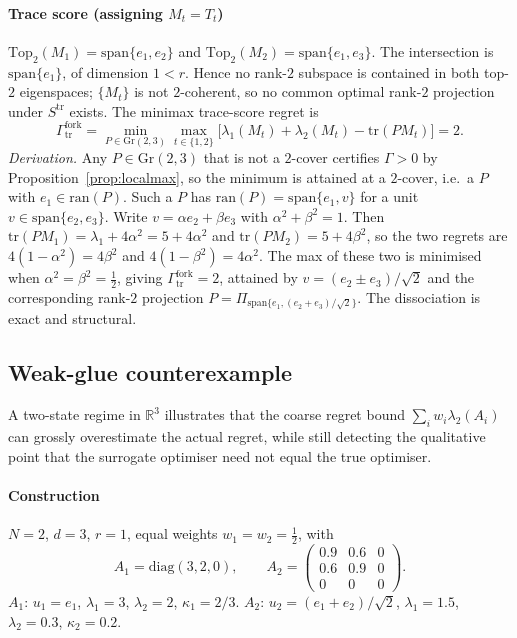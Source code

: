 \documentclass[final,3p,times]{elsarticle}
\newcommand{\Gr}{\mathrm{Gr}}
\newcommand{\tr}{\mathrm{tr}}
\newcommand{\R}{\mathbb{R}}
\newcommand{\ran}{\mathrm{ran}}
\begin{document}
\paragraph{Trace score (assigning $M_t=T_t$)}
$\mathrm{Top}_2(M_1)=\mathrm{span}\{e_1,e_2\}$ and
$\mathrm{Top}_2(M_2)=\mathrm{span}\{e_1,e_3\}$.
The intersection is $\mathrm{span}\{e_1\}$, of dimension $1<r$.
Hence no rank-$2$ subspace is contained in both top-$2$ eigenspaces;
$\{M_t\}$ is not $2$-coherent, so no common optimal rank-$2$ projection
under $S^{\mathrm{tr}}$ exists.
The minimax trace-score regret is
\begin{equation}
\Gamma_{\mathrm{tr}}^{\mathrm{fork}}
=\min_{P\in\Gr(2,3)}\max_{t\in\{1,2\}}
\bigl[\lambda_1(M_t)+\lambda_2(M_t)-\tr(P M_t)\bigr]
=2.
\end{equation}
\emph{Derivation.}
Any $P\in\Gr(2,3)$ that is not a $2$-cover certifies $\Gamma>0$ by
Proposition~\ref{prop:localmax}, so the minimum is attained at a
$2$-cover, i.e.\ a $P$ with $e_1\in\ran(P)$.
Such a $P$ has $\ran(P)=\mathrm{span}\{e_1,v\}$ for a unit
$v\in\mathrm{span}\{e_2,e_3\}$.
Write $v=\alpha e_2+\beta e_3$ with $\alpha^2+\beta^2=1$.
Then $\tr(PM_1)=\lambda_1+4\alpha^2=5+4\alpha^2$ and
$\tr(PM_2)=5+4\beta^2$, so the two regrets are
$4(1-\alpha^2)=4\beta^2$ and $4(1-\beta^2)=4\alpha^2$.
The max of these two is minimised when $\alpha^2=\beta^2=\tfrac{1}{2}$,
giving $\Gamma_{\mathrm{tr}}^{\mathrm{fork}}=2$, attained by
$v=(e_2\pm e_3)/\sqrt 2$ and the corresponding rank-$2$ projection
$P=\Pi_{\mathrm{span}\{e_1,(e_2+e_3)/\sqrt{2}\}}$.
The dissociation is exact and structural.

\subsection{Weak-glue counterexample}

A two-state regime in $\R^3$ illustrates that the coarse regret bound
$\sum_i w_i\lambda_2(A_i)$ can grossly overestimate the actual regret,
while still detecting the qualitative point that the surrogate
optimiser need not equal the true optimiser.

\paragraph{Construction}
$N=2$, $d=3$, $r=1$, equal weights $w_1=w_2=\tfrac{1}{2}$, with
\begin{equation}\label{eq:wgex}
A_1=\mathrm{diag}(3,2,0),\qquad
A_2=\begin{pmatrix} 0.9 & 0.6 & 0\\ 0.6 & 0.9 & 0\\ 0 & 0 & 0\end{pmatrix}.
\end{equation}
$A_1$: $u_1=e_1$, $\lambda_1=3$, $\lambda_2=2$, $\kappa_1=2/3$.
$A_2$: $u_2=(e_1+e_2)/\sqrt 2$, $\lambda_1=1.5$, $\lambda_2=0.3$,
$\kappa_2=0.2$.
\end{document}
